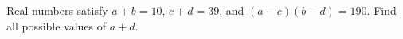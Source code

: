 Real numbers satisfy $ a+b=10 $, $ c+d=39 $, and $(a-c)(b-d)=190 $. Find all possible values of $ a+d $.
